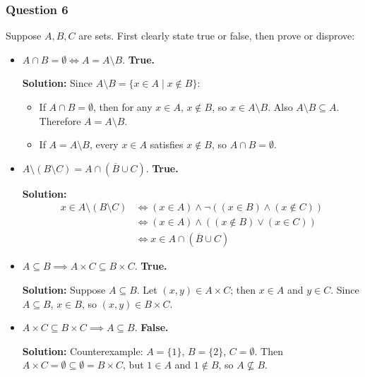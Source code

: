 \documentclass[
	letterpaper, %
	11pt, %
]{CSUniSchoolLabReport}
\begin{document}
\pagebreak

\subsubsection*{Question 6}
Suppose $A, B, C$ are sets. First clearly state true or false, then prove or disprove:
\begin{itemize}
	\item $A\cap B = \emptyset \iff A = A\setminus B$. \textbf{True.}

	\textbf{Solution: } Since $A \setminus B = \{x \in A \mid x \notin B\}$:
	\begin{itemize}
		\item If $A \cap B = \emptyset$, then for any $x \in A$, $x \notin B$, so $x \in A \setminus B$. Also $A \setminus B \subseteq A$. Therefore $A = A \setminus B$.
		\item If $A = A \setminus B$, every $x \in A$ satisfies $x \notin B$, so $A \cap B = \emptyset$.
	\end{itemize}

	\item $A\setminus\left(B\setminus C\right) = A\cap \left(\overline{B} \cup C\right)$. \textbf{True.}

	\textbf{Solution: }
	\[
	\begin{aligned}
		x \in A\setminus(B\setminus C)
		&\iff (x \in A) \land \lnot\left((x \in B) \land (x \notin C)\right) \\
		&\iff (x \in A) \land \left((x \notin B) \lor (x \in C)\right) \\
		&\iff x \in A \cap \left(\overline{B} \cup C\right)
	\end{aligned}
	\]

	\item $A \subseteq B \implies A\times C \subseteq B\times C$. \textbf{True.}

	\textbf{Solution: } Suppose $A \subseteq B$. Let $(x, y) \in A \times C$; then $x \in A$ and $y \in C$.
	Since $A \subseteq B$, $x \in B$, so $(x, y) \in B \times C$.

	\item $A\times C \subseteq B\times C \implies A\subseteq B$. \textbf{False.}

	\textbf{Solution: } Counterexample: $A = \{1\}$, $B = \{2\}$, $C = \emptyset$.
	Then $A \times C = \emptyset \subseteq \emptyset = B \times C$, but $1 \in A$ and $1 \notin B$, so $A \not\subseteq B$.
\end{itemize}

\pagebreak
\end{document}
